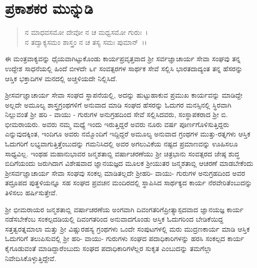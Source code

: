 
\chapter*{ಪ್ರಕಾಶಕರ ಮುನ್ನುಡಿ}

\begin{verse}
ನ ಮಾಧವಸಮೋ ದೇವೋ ನ ಚ ಮಧ್ವಸಮೋ ಗುರುಃ~।\\ ನ ತದ್ವಾಕ್ಯಸಮಂ ಶಾಸ್ತ್ರಂ ನ ಚ ತಸ್ಯ ಸಮಃ ಪುಮಾನ್~।।
\end{verse}

ಈ ಮಂತ್ರವಾಕ್ಯವನ್ನು ಧೈಯವಾಗಿಟ್ಟುಕೊಂಡು ಕಾರ್ಯಪ್ರವೃತ್ತವಾದ ಶ‍್ರೀ ಸರ್ವಜ್ಞಾ\-ಚಾರ್ಯ ಸೇವಾ ಸಂಘವು ತನ್ನ ಉದ್ದೇಶ ಸಾಧನೆಯಲ್ಲಿ ಹಿಂದೆ ಬೀಳದೇ ೬೯ ಸಂವತ್ಸರಗಳ ಸಾರ್ಥಕ ಸೇವೆ ಸಲ್ಲಿಸಿ ಭಾರತದಾದ್ಯಂತ ತನ್ನ ಹೆಸರನ್ನು ಆಸ್ತಿಕ ಭಕ್ತಾದಿಗಳ ಮನದಲ್ಲಿ ಅಚ್ಚಳಿಯದೇ ನಿಲ್ಲಿಸಿದೆ.

ಶ‍್ರೀಸರ್ವಜ್ಞಾಚಾರ್ಯ ಸೇವಾ ಸಂಘದ ಸ್ಥಾಪನೆಯಲ್ಲಿ, ಅದನ್ನು ಹುಟ್ಟುಹಾಕುವ ಪ್ರಮುಖ ಕಾರ್ಯವನ್ನು ಮಾಡಿದ್ದೇ ಅಲ್ಲದೇ ಅಮೂಲ್ಯ ಶಾಸ್ತ್ರಗ್ರಂಥಗಳಿಗೆ ಅನುವಾದ ಮಾಡಿ ಸಂಘದ ಹೆಸರನ್ನು ಓದುಗರ ಮನಸ್ಸಿನಲ್ಲಿ ಸ್ಥಿರವಾಗಿ ನಿಲ್ಲುವಂತೆ ಶ‍್ರೀ ಹರಿ - ವಾಯು - ಗುರು\-ಗಳ ಅನುಗ್ರಹದಿಂದ ಸೇವೆ ಸಲ್ಲಿಸಿದವರು, ಸಂಸ್ಥಾಪಕರಾದ ಶ‍್ರೀ ಬಿ. ಭೀಮರಾಯರು. ಅವರು ನಮ್ಮ ಮಧ್ಯೆ ಇಂದು ಇರುತ್ತಿದ್ದರೆ ಅವರು ನೂರು ವರ್ಷ ಪೂರ್ಣಗೊಳಿಸುತ್ತಿದ್ದರು ಎನ್ನುವುದಕ್ಕಿಂತ, ಇಂದಿಗೂ ಅವರು ನಮ್ಮೊಂದಿಗೆ ಇದ್ದಿದ್ದರೆ ಅಮೂಲ್ಯ ಅನುವಾದ ಗ್ರಂಥಗಳ ಮುತ್ತು-ರತ್ನಗಳು ಆಸ್ತಿಕ ಓದುಗರಿಗೆ ಲಭ್ಯವಾಗುತ್ತಿತ್ತೆಂಬುದನ್ನು ಗಮನಿಸಿದಲ್ಲಿ ಅವರ ಅಗಲುವಿಕೆಯ ನಷ್ಟದ ಪ್ರಮಾಣವನ್ನು ಊಹಿಸಲೂ ಸಾಧ್ಯವಿಲ್ಲ. ಇಂಥಹ ಮಹಾನುಭಾವರ ಜನ್ಮಶತಾಬ್ದಿ ವರ್ಷಾಚರಣೆಯು ಶ‍್ರೀ ಚಿತ್ರಭಾನು ಸಂವತ್ಸರದ ಜೇಷ್ಠ ಶುದ್ಧ ಬಿದಿಗೆಯಂದು ಜರುಗಿದಾಗ ವಿಶೇಷವಾದ ಜ್ಞಾನಯಜ್ಞದ ಮೂಲಕ ಶ‍್ರೀಯುತರ ಜನ್ಮಶತಾಬ್ಲಿ ಆಚರಣೆ ಮಾಡಬೇಕೆಂದು ಶ‍್ರೀಸರ್ವಜ್ಞಾಚಾರ್ಯ ಸೇವಾ ಸಂಘವು ಸಂಕಲ್ಪ ಮಾಡಿತಲ್ಲದೇ ಶ‍್ರೀಹರಿ- ವಾಯು- ಗುರುಗಳ ಅನುಗ್ರಹದಿಂದ ಅವರ ತದ್ರೂಪದ ಪುತ್ಥಳಿಯನ್ನೂ ಸಹ ಸಂಘದ ಪ್ರವಚನ ಮಂದಿರದಲ್ಲಿ ಸ್ಥಾಪಿಸಿದ ಸಾರ್ಥಕ್ಯದ ಕಾರ್ಯ ನೆರವೇರಿತೆಂಬುದನ್ನು ತಿಳಿಸಲು ಹರ್ಷಿಸುತ್ತೇವೆ.

\newpage

ಶ‍್ರೀ ಭೀಮರಾಯರ ಜನ್ಮಶತಾಬ್ಲಿ ವರ್ಷಾಚರಣೆಯ ಅಂಗವಾಗಿ ದಿವಂಗತರಿಗೆ\break ಪ್ರೀತ್ಯಾಸ್ಪದವಾದ ಜ್ಞಾನಯಜ್ಞ ಕಾರ್ಯ ನಡೆಸಬೇಕೆಂಬ ಸಂಕಲ್ಪದಡಿಯಲ್ಲಿ ದಿವಂಗತರಿಂದ ಅನುವಾದಗೊಂಡು ಆಸ್ತಿಕ ಓದುಗರಿಂದ ಬೇಡಿಕೆಯಿದ್ದ ಸತ್ತತ್ವರತ್ನಮಾಲಾ ಮತ್ತು ಶ‍್ರೀ ವಿಷ್ಣುರಹಸ್ಯ ಗ್ರಂಥಗಳು ಒಂದೇ ಸಂಪುಟಗಳಲ್ಲಿ ಮರು ಮುದ್ರಣಕಾರ್ಯ ಮಾಡಿ ಆಸ್ತಿಕ ಓದುಗರಿಗೆ ತಲುಪಿಸುವಲ್ಲಿ ಶ‍್ರೀ ಹರಿ- ವಾಯು- ಗುರುಗಳು ಸಂಘದ ಪದಾಧಿಕಾರಿಗಳನ್ನು ಹರಸಿ ಸಂಕಲ್ಪದ ಕಾರ್ಯ ಕೈಗೂಡುವಂತೆ ಮಾಡಿದ್ದಾರೆಂಬುದು ಸಂಘದ ಪದಾಧಿಕಾರಿಗಳೆಲ್ಲರ ಸುಕೃತ ಎಂಬುದನ್ನು ತಮಗೆಲ್ಲಾ ನಿವೇದಿಸಿಕೊಳ್ಳುತ್ತಿದ್ದೇವೆ.

